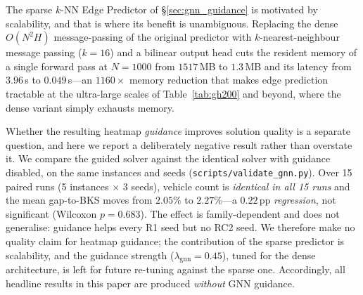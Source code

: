 \documentclass[conference]{IEEEtran}
\begin{document}
The sparse $k$-NN Edge Predictor of \S\ref{sec:gnn_guidance} is motivated by
scalability, and that is where its benefit is unambiguous. Replacing the dense
$O(N^2H)$ message-passing of the original predictor with $k$-nearest-neighbour
message passing ($k{=}16$) and a bilinear output head cuts the resident memory of
a single forward pass at $N{=}1000$ from $1517$\,MB to $1.3$\,MB and its latency
from $3.96$\,s to $0.049$\,s---an $1160{\times}$ memory reduction that makes edge
prediction tractable at the ultra-large scales of Table~\ref{tab:gh200} and
beyond, where the dense variant simply exhausts memory.

Whether the resulting heatmap \emph{guidance} improves solution quality is a
separate question, and here we report a deliberately negative result rather than
overstate it. We compare the guided solver against the identical solver with
guidance disabled, on the same instances and seeds
(\texttt{scripts/validate\_gnn.py}). Over 15 paired runs (5 instances $\times$ 3
seeds), vehicle count is \emph{identical in all 15 runs} and the mean gap-to-BKS
moves from $2.05\%$ to $2.27\%$---a $0.22$\,pp \emph{regression}, not significant
(Wilcoxon $p=0.683$). The effect is family-dependent and does not generalise:
guidance helps every R1 seed but no RC2 seed. We therefore make no quality claim
for heatmap guidance; the contribution of the sparse predictor is scalability,
and the guidance strength ($\lambda_{\text{gnn}}{=}0.45$), tuned for the dense
architecture, is left for future re-tuning against the sparse one. Accordingly,
all headline results in this paper are produced \emph{without} GNN guidance.

\begin{table}[!h]
\centering
\caption{Sparse $k$-NN vs.\ dense GNN Edge Predictor: cost of a single forward
pass. The sparse architecture is what makes edge prediction feasible at
ultra-large scale; the dense variant runs out of memory at $N{=}1000$.}
\label{tab:gnn_comparison}
\renewcommand{\arraystretch}{1.08}
\setlength{\tabcolsep}{4pt}
\end{table}
\end{document}
